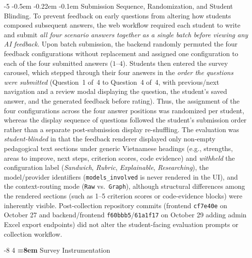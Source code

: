 \documentclass{llncs}
\makeatletter
\renewcommand\subsection{\@startsection{subsection}{2}{\z@}%
                       {-8\p@ \@plus -2\p@ \@minus -2\p@}%
                       {4\p@ \@plus 1\p@ \@minus 1\p@}%
                       {\normalfont\normalsize\bfseries\boldmath
                        \rightskip=\z@ \@plus 8em\pretolerance=10000 }}
\renewcommand\paragraph{\@startsection{paragraph}{4}{\z@}%
                       {-5\p@ \@plus -1\p@ \@minus -1\p@}%
                       {-0.5em \@plus -0.22em \@minus -0.1em}%
                       {\normalfont\normalsize\itshape}}
\makeatother
\begin{document}
\paragraph{Submission Sequence, Randomization, and Student Blinding.}
To prevent feedback on early questions from altering how students composed subsequent answers, the web workflow required each student to write and submit \emph{all four scenario answers together as a single batch before viewing any AI feedback}. Upon batch submission, the backend randomly permuted the four feedback configurations without replacement and assigned one configuration to each of the four submitted answers ($1\text{--}4$). Students then entered the survey carousel, which stepped through their four answers in the \emph{order the questions were submitted} (Question~1 of~4 to Question~4 of~4, with previous/next navigation and a review modal displaying the question, the student's saved answer, and the generated feedback before rating). Thus, the assignment of the four configurations across the four answer positions was randomized per student, whereas the display sequence of questions followed the student's submission order rather than a separate post-submission display re-shuffling. The evaluation was \emph{student-blinded} in that the feedback renderer displayed only non-empty pedagogical text sections under generic Vietnamese headings (e.g., strengths, areas to improve, next steps, criterion scores, code evidence) and \emph{withheld} the configuration label (\textit{Sandwich}, \textit{Rubric}, \textit{Explainable}, \textit{Researching}), the model/provider identifiers (\texttt{models\_involved} is never rendered in the UI), and the context-routing mode (\texttt{Raw} vs.\ \texttt{Graph}), although structural differences among the rendered sections (such as 1--5 criterion scores or code-evidence blocks) were inherently visible. Post-collection repository commits (frontend \texttt{cf7e40e} on October 27 and backend/frontend \texttt{f60bbb5}/\texttt{61a1f17} on October 29 adding admin Excel export endpoints) did not alter the student-facing evaluation prompts or collection workflow.

\subsection{Survey Instrumentation}
\end{document}
